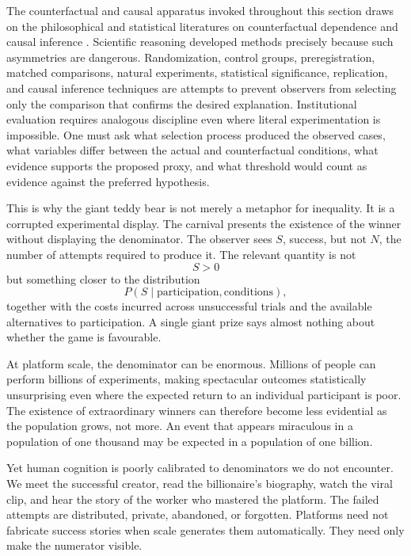 \documentclass[11pt]{article}
\begin{document}
The counterfactual and causal apparatus invoked throughout this section draws on the philosophical and statistical literatures on counterfactual dependence and causal inference \parencite{lewis1973counterfactuals,pearl2009causality}. Scientific reasoning developed methods precisely because such asymmetries are dangerous. Randomization, control groups, preregistration, matched comparisons, natural experiments, statistical significance, replication, and causal inference techniques are attempts to prevent observers from selecting only the comparison that confirms the desired explanation. Institutional evaluation requires analogous discipline even where literal experimentation is impossible. One must ask what selection process produced the observed cases, what variables differ between the actual and counterfactual conditions, what evidence supports the proposed proxy, and what threshold would count as evidence against the preferred hypothesis.

This is why the giant teddy bear is not merely a metaphor for inequality. It is a corrupted experimental display. The carnival presents the existence of the winner without displaying the denominator. The observer sees \(S\), success, but not \(N\), the number of attempts required to produce it. The relevant quantity is not
\[
S>0
\]
but something closer to the distribution
\[
P(S\mid \text{participation},\text{conditions}),
\]
together with the costs incurred across unsuccessful trials and the available alternatives to participation. A single giant prize says almost nothing about whether the game is favourable.

At platform scale, the denominator can be enormous. Millions of people can perform billions of experiments, making spectacular outcomes statistically unsurprising even where the expected return to an individual participant is poor. The existence of extraordinary winners can therefore become less evidential as the population grows, not more. An event that appears miraculous in a population of one thousand may be expected in a population of one billion.

Yet human cognition is poorly calibrated to denominators we do not encounter. We meet the successful creator, read the billionaire's biography, watch the viral clip, and hear the story of the worker who mastered the platform. The failed attempts are distributed, private, abandoned, or forgotten. Platforms need not fabricate success stories when scale generates them automatically. They need only make the numerator visible.
\end{document}
